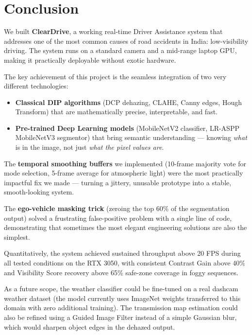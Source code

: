 \documentclass[12pt, a4paper]{article}
\begin{document}
\section{Conclusion}

We built \textbf{ClearDrive}, a working real-time Driver Assistance system that
addresses one of the most common causes of road accidents in India: low-visibility
driving. The system runs on a standard camera and a mid-range laptop GPU, making
it practically deployable without exotic hardware.

The key achievement of this project is the seamless integration of two very
different technologies:

\begin{itemize}
  \item \textbf{Classical DIP algorithms} (DCP dehazing, CLAHE, Canny edges,
  Hough Transform) that are mathematically precise, interpretable, and fast.
  \item \textbf{Pre-trained Deep Learning models} (MobileNetV2 classifier,
  LR-ASPP MobileNetV3 segmentor) that bring semantic understanding — knowing
  \textit{what} is in the image, not just \textit{what the pixel values are}.
\end{itemize}

The \textbf{temporal smoothing buffers} we implemented (10-frame majority vote
for mode selection, 5-frame average for atmospheric light) were the most
practically impactful fix we made — turning a jittery, unusable prototype into
a stable, smooth-looking system.

The \textbf{ego-vehicle masking trick} (zeroing the top 60\% of the segmentation
output) solved a frustrating false-positive problem with a single line of code,
demonstrating that sometimes the most elegant engineering solutions are also the
simplest.

Quantitatively, the system achieved sustained throughput above 20 FPS during
all tested conditions on the RTX 3050, with consistent Contrast Gain above 40\%
and Visibility Score recovery above 65\% safe-zone coverage in foggy sequences.

As a future scope, the weather classifier could be fine-tuned on a real dashcam
weather dataset (the model currently uses ImageNet weights transferred to this
domain with zero additional training). The transmission map estimation could
also be refined using a Guided Image Filter instead of a simple Gaussian blur,
which would sharpen object edges in the dehazed output.
\end{document}
